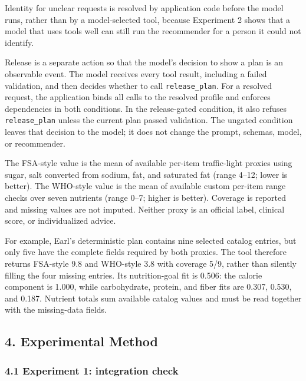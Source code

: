 \documentclass[
  10pt,
  letterpaper,
]{article}
\begin{document}
Identity for unclear requests is resolved by application code before the
model runs, rather than by a model-selected tool, because Experiment 2
shows that a model that uses tools well can still run the recommender
for a person it could not identify.

Release is a separate action so that the model's decision to show a plan
is an observable event. The model receives every tool result, including
a failed validation, and then decides whether to call
\texttt{release\_plan}. For a resolved request, the application binds
all calls to the resolved profile and enforces dependencies in both
conditions. In the release-gated condition, it also refuses
\texttt{release\_plan} unless the current plan passed validation. The
ungated condition leaves that decision to the model; it does not change
the prompt, schemas, model, or recommender.

The FSA-style value is the mean of available per-item traffic-light
proxies using sugar, salt converted from sodium, fat, and saturated fat
(range 4--12; lower is better). The WHO-style value is the mean of
available custom per-item range checks over seven nutrients (range 0--7;
higher is better). Coverage is reported and missing values are not
imputed. Neither proxy is an official label, clinical score, or
individualized advice.

For example, Earl's deterministic plan contains nine selected catalog
entries, but only five have the complete fields required by both
proxies. The tool therefore returns FSA-style 9.8 and WHO-style 3.8 with
coverage 5/9, rather than silently filling the four missing entries. Its
nutrition-goal fit is 0.506: the calorie component is 1.000, while
carbohydrate, protein, and fiber fits are 0.307, 0.530, and 0.187.
Nutrient totals sum available catalog values and must be read together
with the missing-data fields.

\subsection{4. Experimental Method}\label{experimental-method}

\subsubsection{4.1 Experiment 1: integration
check}\label{experiment-1-integration-check}
\end{document}
